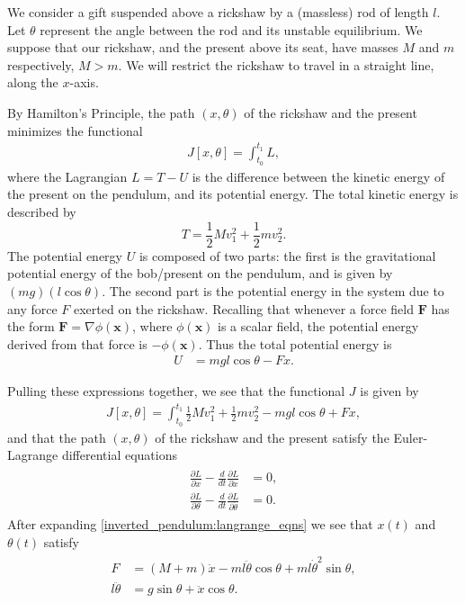 We consider a gift suspended above a rickshaw by a (massless) rod of length $l$. 
Let $\theta $ represent the angle between the rod and its unstable equilibrium. 
We suppose that our rickshaw, and the present above its seat, have masses $M$ and $m$ respectively, $M > m$.  
We will restrict the rickshaw to travel in a straight line, along the $x$-axis.

By Hamilton's Principle, the path $(x,\theta)$ of the rickshaw and the present minimizes the functional 
\begin{align}
J[x,\theta] = \int_{t_0}^{t_1}	L,
\end{align}
where the Lagrangian $L = T - U$ is the difference between the kinetic energy of the present on the pendulum, and its potential energy.
The total kinetic energy is described by 
\[T = \frac{1}{2}Mv_1^2 +  \frac{1}{2}mv_2^2
.\]
The potential energy $U$ is composed of two parts: the first is the gravitational potential energy of the bob/present on the pendulum, and is given by $(mg)(l\cos \theta)$.
The second part is the potential energy in the system due to any force $F$ exerted on the rickshaw. 
Recalling that whenever a force field $\mathbf{F}$ has the form $\mathbf{F} = \nabla \phi(\mathbf{x})$, where $\phi(\mathbf{x})$ is a scalar field, the potential energy derived from that force is $ -\phi(\mathbf{x})$.
Thus the total potential energy is 
\begin{align*}
U &= mgl\cos \theta - Fx.
\end{align*}

Pulling these expressions together, we see that the functional $J$ is given by 
\begin{align}
	J[x,\theta] = \int_{t_0}^{t_1} \frac{1}{2}Mv_1^2 +  \frac{1}{2}mv_2^2 - mgl\cos \theta + Fx,
\end{align}	
and that the path $(x,\theta)$ of the rickshaw and the present satisfy the Euler-Lagrange differential equations 
\begin{align}
	\begin{split}
\frac{\partial L}{\partial x} - \frac{d}{dt} \frac{\partial L}{\partial \dot{x}} &= 0,\\
\frac{\partial L}{\partial \theta} - \frac{d}{dt} \frac{\partial L}{\partial \dot{\theta}} &= 0.
	\end{split}\label{inverted_pendulum:langrange_eqns}
\end{align}
After expanding \eqref{inverted_pendulum:langrange_eqns} we see that $x(t)$ and $\theta(t)$ satisfy
\begin{align}
	\begin{split}
		F &= (M + m)\ddot{x} - ml\ddot{\theta} \cos \theta + ml \dot{\theta}^2 \sin \theta,\\
		l \ddot{\theta} &= g \sin \theta + \ddot{x} \cos \theta.
	\end{split}\label{inverted_pendulum:langrange_eqns_explicit}
\end{align}


